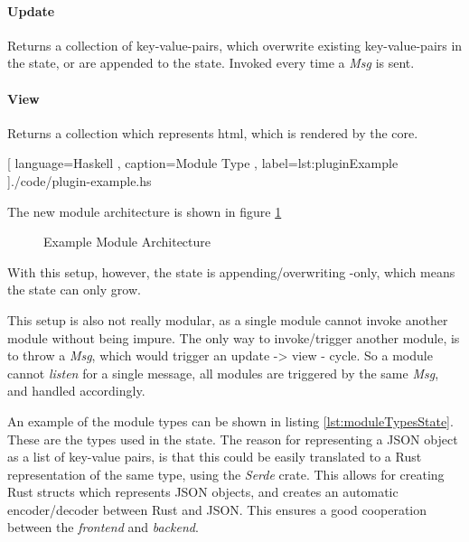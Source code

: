 \paragraph{Update} Returns a collection of key-value-pairs, which
overwrite existing key-value-pairs in the state, or are appended to the state.
Invoked every time a \textit{Msg} is sent.

\paragraph{View} Returns a collection which represents \gls{html},
which is rendered by the core.

\begin{center}
  
    [ language=Haskell
    , caption={Module Type}
    , label=lst:pluginExample
    ]{./code/plugin-example.hs}
\end{center}

The new module architecture is shown in figure \ref{fig:moduleArchitecture}

\begin{figure}
  \centering
  
  \caption{Example Module Architecture}
  \label{fig:moduleArchitecture}
\end{figure}


With this setup, however, the state is appending/overwriting -only, which means
the state can only grow.

This setup is also not really modular, as a single module cannot invoke another
module without being impure. The only way to invoke/trigger another module, is
to throw a \textit{Msg}, which would trigger an update -> view - cycle. So
a module cannot \textit{listen} for a single message, all modules are triggered
by the same \textit{Msg}, and handled accordingly.

An example of the module types can be shown in listing
\ref{lst:moduleTypesState}. These are the types used in the state. The reason
for representing a JSON object as a list of key-value pairs, is that this could
be easily translated to a Rust representation of the same type, using the
\textit{Serde} crate. This allows for creating Rust structs which represents
JSON objects, and creates an automatic encoder/decoder between Rust and JSON.
This ensures a good cooperation between the \textit{frontend} and
\textit{backend}.

